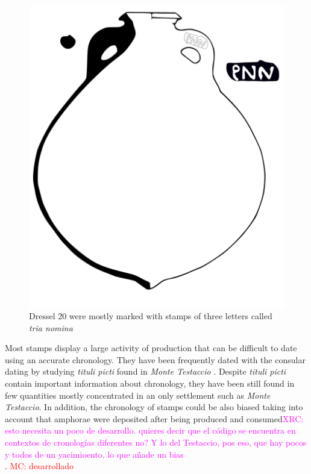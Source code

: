 \documentclass[review]{elsarticle}
\newcommand{\memo}[2]{\textcolor{#1}{#2}}
\newcommand{\maria}[1]{\memo{red}{MC: #1\\}}
\newcommand{\xavi}[1]{\memo{magenta}{XRC: #1\\}}
\begin{document}
\begin{figure}[htp]
	\centering
\includegraphics[scale=0.5]{figs/dressel20}
\caption{Dressel 20 were mostly marked with stamps of three letters called \textit{tria nomina}}
\label{amphora}
\end{figure} 

Most stamps display a large activity of production that can be difficult to date using an accurate chronology. They have been frequently dated with the consular dating by studying \textit{tituli picti} found in \textit{Monte Testaccio} \citep{Testaccio1, berni_millet_epigrafianforica_2008}.
Despite \textit{tituli picti} contain important information about chronology, they have been still found in few quantities mostly concentrated in an only settlement such as \textit{Monte Testaccio}. In addition, the chronology of stamps could be also biased taking into account that amphorae were deposited after being produced and consumed\xavi{esto necesita un poco de desarrollo. quieres decir que el código se encuentra en contextos de cronologías diferentes no? Y lo del Testaccio, pos eso, que hay pocos y todos de un yacimioento, lo que añade un bias}. 
\maria{desarrollado} 
\end{document}
